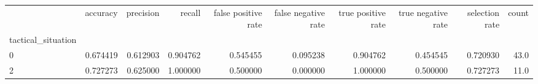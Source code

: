 \begin{tabular}{lrrrrrrrrr}
\toprule
{} &  accuracy &  precision &    recall &  false positive rate &  false negative rate &  true positive rate &  true negative rate &  selection rate &  count \\
tactical\_situation &           &            &           &                      &                      &                     &                     &                 &        \\
\midrule
0                  &  0.674419 &   0.612903 &  0.904762 &             0.545455 &             0.095238 &            0.904762 &            0.454545 &        0.720930 &   43.0 \\
2                  &  0.727273 &   0.625000 &  1.000000 &             0.500000 &             0.000000 &            1.000000 &            0.500000 &        0.727273 &   11.0 \\
\bottomrule
\end{tabular}
